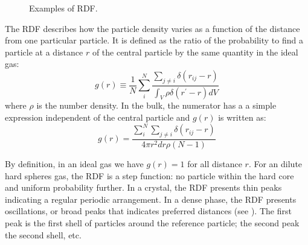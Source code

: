 \begin{figure}
	\centering
	\caption{Examples of \acf{RDF}.}
	\label{fig:rdf}
\end{figure}

The \acf{RDF} describes how the particle density varies as a function of the distance from one particular particle. It is defined as the ratio of the probability to find a particle at a distance $r$ of the central particle by the same quantity in the ideal gas:
\begin{equation}
	g(r) \equiv \frac{1}{N} \sum_{i}^N \frac{
		\sum_{j\neq i} \delta(r_{ij} - r)
		}{
		\int_V \rho \delta(r^\prime-r) dV
		}
	\label{eq:rdf}
\end{equation}
where $\rho$ is the number density. In the bulk, the numerator has a a simple expression independent of the central particle and $g(r)$ is written as:
\begin{equation}
	g(r) = \frac{
		\sum_{i}^N \sum_{j\neq i} \delta(r_{ij} - r)
		}{
		4\pi r^2 dr \rho(N-1)
		}
	\label{eq:rdf_bulk}
\end{equation}

By definition, in an ideal gas we have $g(r)=1$ for all distance $r$. For an dilute hard spheres gas, the \ac{RDF} is a step function: no particle within the hard core and uniform probability further. In a crystal, the \ac{RDF} presents thin peaks indicating a regular periodic arrangement. In a dense phase, the \ac{RDF} presents oscillations, or broad peaks that indicates preferred distances (see ). The first peak is the first shell of particles around the reference particle; the second peak the second shell, etc.

